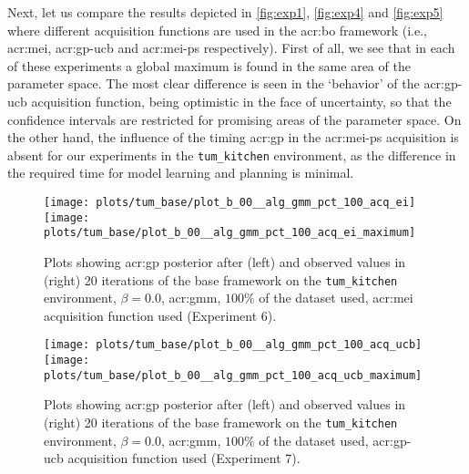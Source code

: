 
Next, let us compare the results depicted in \autoref{fig:exp1}, \autoref{fig:exp4} and \autoref{fig:exp5} where different acquisition functions are used in the \acrshort{acr:bo} framework (i.e., \acrshort{acr:mei}, \acrshort{acr:gp-ucb} and \acrshort{acr:mei-ps} respectively).
First of all, we see that in each of these experiments a global maximum is found in the same area of the parameter space.
The most clear difference is seen in the `behavior' of the \acrshort{acr:gp-ucb} acquisition function, being optimistic in the face of uncertainty, so that the confidence intervals are restricted for promising areas of the parameter space.
On the other hand, the influence of the timing \acrshort{acr:gp} in the \acrshort{acr:mei-ps} acquisition  is absent for our experiments in the \texttt{tum\_kitchen} environment, as the difference in the required time for model learning and planning is minimal.

\begin{figure}[t!]
	\centering
	\texttt{[image: plots/tum\_base/plot\_b\_00\_\_alg\_gmm\_pct\_100\_acq\_ei]}
	\texttt{[image: plots/tum\_base/plot\_b\_00\_\_alg\_gmm\_pct\_100\_acq\_ei\_maximum]}
	\caption{Plots showing \acrshort{acr:gp} posterior after (left) and observed values in (right) 20 iterations of the base framework on the \texttt{tum\_kitchen} environment, $\beta = 0.0$, \acrshort{acr:gmm}, $100\%$ of the dataset used, \acrshort{acr:mei} acquisition function used (Experiment 6).}
	\label{fig:exp6}
\end{figure}
\begin{figure}[t!]
	\centering
	\texttt{[image: plots/tum\_base/plot\_b\_00\_\_alg\_gmm\_pct\_100\_acq\_ucb]}
	\texttt{[image: plots/tum\_base/plot\_b\_00\_\_alg\_gmm\_pct\_100\_acq\_ucb\_maximum]}
	\caption{Plots showing \acrshort{acr:gp} posterior after (left) and observed values in (right) 20 iterations of the base framework on the \texttt{tum\_kitchen} environment, $\beta = 0.0$, \acrshort{acr:gmm}, $100\%$ of the dataset used, \acrshort{acr:gp-ucb} acquisition function used (Experiment 7).}
	\label{fig:exp7}
\end{figure}

